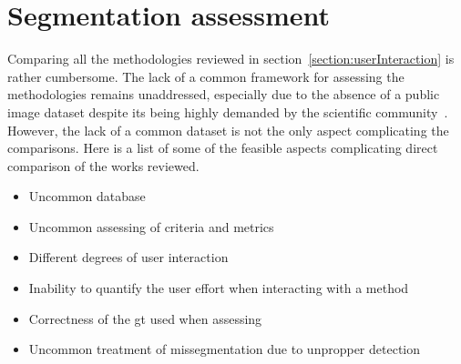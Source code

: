 \graphicspath{{./content/seg_assessment/figures/}}
\section{Segmentation assessment}\label{section:assessment}
Comparing all the methodologies reviewed in section~\ref{section:userInteraction} is rather cumbersome. The lack of a common framework for assessing the methodologies remains unaddressed, especially due to the absence of a public image dataset despite its being highly demanded by the scientific community~\cite{Noble:2006p1734,Noble:2009p14330,Cheng:2009p10580}. However, the lack of a common dataset is not the only aspect complicating the comparisons. Here is a list of some of the feasible aspects complicating direct comparison of the works reviewed.

\begin{itemize}
\item Uncommon database
\item Uncommon assessing of criteria and metrics
\item Different degrees of user interaction
\item Inability to quantify the user effort when interacting with a method
\item Correctness of the \ac{gt} used when assessing
\item Uncommon treatment of missegmentation due to unpropper detection
\end{itemize}

%



